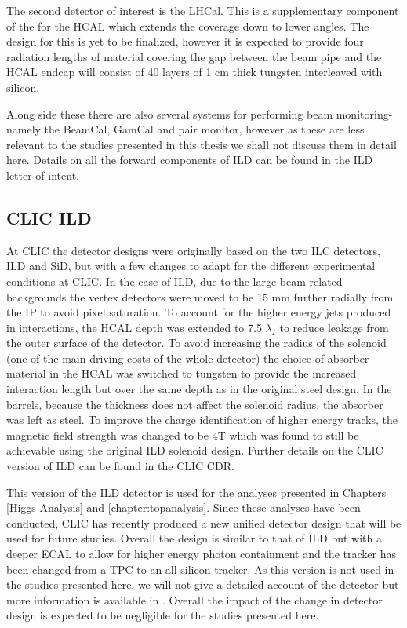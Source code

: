 The second detector of interest is the LHCal. This is a supplementary component of the for the \ac{HCAL} which extends the coverage down to lower angles. The design for this is yet to be finalized, however it is expected to provide four radiation lengths of material covering the gap between the beam pipe and the \ac{HCAL} endcap will consist of 40 layers of 1 cm thick tungsten interleaved with silicon.

Along side these there are also several systems for performing beam monitoring- namely the BeamCal, GamCal and pair monitor, however as these are less relevant to the studies presented in this thesis we shall not discuss them in detail here. Details on all the forward components of \ac{ILD} can be found in the \ac{ILD} letter of intent\cite{ILD}.


\subsection{CLIC ILD}

At \ac{CLIC} the detector designs were originally based on the two \ac{ILC} detectors, \ac{ILD} and \ac{SiD}, but with a few changes to adapt for the different experimental conditions at \ac{CLIC}. In the case of \ac{ILD}, due to the large beam related backgrounds the vertex detectors were moved to be 15 mm further radially from the \ac{IP} to avoid pixel saturation. To account for the higher energy jets produced in interactions, the \ac{HCAL} depth was extended to 7.5 $\lambda_I$ to reduce leakage from the outer surface of the detector. To avoid increasing the radius of the solenoid (one of the main driving costs of the whole detector) the choice of absorber material in the \ac{HCAL} was switched to tungsten to provide the increased interaction length but over the same depth as in the original steel design. In the barrels, because the thickness does not affect the solenoid radius, the absorber was left as steel. To improve the charge identification of higher energy tracks, the magnetic field strength was changed to be 4T which was found to still be achievable using the original \ac{ILD} solenoid design. Further details on the CLIC version of \ac{ILD} can be found in the \ac{CLIC} \ac{CDR}\cite{CDR}.

This version of the \ac{ILD} detector is used for the analyses presented in Chapters \ref{Higgs Analysis} and \ref{chapter:topanalysis}. Since these analyses have been conducted, \ac{CLIC} has recently produced a new unified detector design that will be used for future studies. Overall the design is similar to that of \ac{ILD} but with a deeper \ac{ECAL} to allow for higher energy photon containment and the tracker has been changed from a \ac{TPC} to an all silicon tracker. As this version is not used in the studies presented here, we will not give a detailed account of the detector but more information is available in \cite{Pitters:2018jxt}. Overall the impact of the change in detector design is expected to be negligible for the studies presented here.






